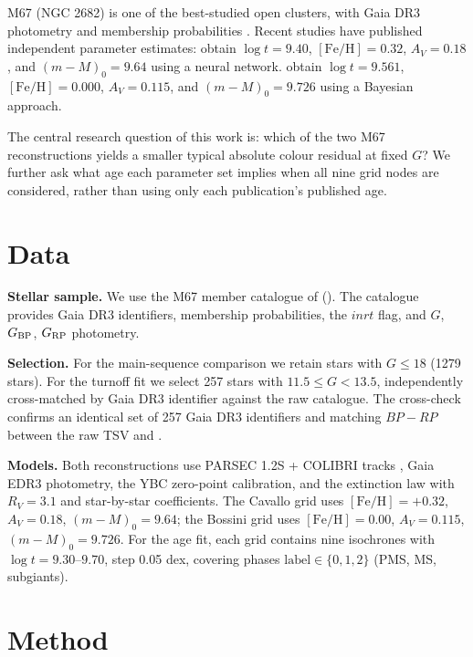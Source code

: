 \documentclass{article}
\begin{document}
M67 (NGC 2682) is one of the best-studied open clusters, with Gaia DR3 photometry and membership
probabilities \citep{HuntReffert2023}. Recent studies have published independent parameter estimates:
\citet{Cavallo2024} obtain $\log t = 9.40$, $[\mathrm{Fe/H}] = 0.32$, $A_V = 0.18$, and
$(m-M)_0 = 9.64$ using a neural network. \citet{Bossini2019} obtain $\log t = 9.561$,
$[\mathrm{Fe/H}] = 0.000$, $A_V = 0.115$, and $(m-M)_0 = 9.726$ using a Bayesian approach.

\porozhdeno{}The central research question of this work is: which of the two M67 reconstructions
yields a smaller typical absolute colour residual at fixed $G$? We further ask what age each
parameter set implies when all nine grid nodes are considered, rather than using only each
publication's published age.

\section{Data}
\label{sec:data}

\textbf{Stellar sample.} We use the M67 member catalogue of \citet{HuntReffert2023}
(). The catalogue provides Gaia DR3 identifiers,
membership probabilities, the $inrt$ flag, and $G$, $G_{\rm BP}$, $G_{\rm RP}$ photometry.

\textbf{Selection.} For the main-sequence comparison we retain stars with $G \leq 18$
(1279 stars). For the turnoff fit we select 257 stars with $11.5 \le G < 13.5$,
independently cross-matched by Gaia DR3 identifier against the raw catalogue.
The cross-check confirms an identical set of 257 Gaia DR3 identifiers and matching
$BP-RP$ between the raw TSV and .

\textbf{Models.} Both reconstructions use PARSEC 1.2S + COLIBRI tracks
\citep{Bressan2012, Chen2019}, Gaia EDR3 photometry, the YBC zero-point calibration,
and the \citet{Cardelli1989} extinction law with $R_V = 3.1$ and star-by-star coefficients.
The Cavallo grid uses $[\mathrm{Fe/H}] = +0.32$, $A_V = 0.18$, $(m-M)_0 = 9.64$;
the Bossini grid uses $[\mathrm{Fe/H}] = 0.00$, $A_V = 0.115$, $(m-M)_0 = 9.726$.
For the age fit, each grid contains nine isochrones with $\log t = 9.30$--$9.70$,
step 0.05 dex, covering phases $\mathrm{label}\in\{0,1,2\}$ (PMS, MS, subgiants).

\section{Method}
\label{sec:method}
\end{document}
